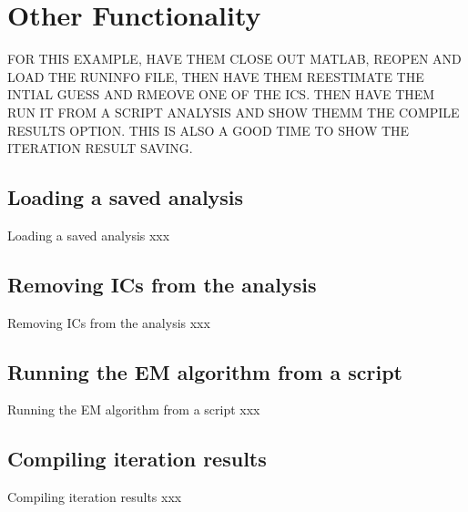 \documentclass[11pt]{beamer}
\begin{document}
\section{Other Functionality}

\begin{frame}
FOR THIS EXAMPLE, HAVE THEM CLOSE OUT MATLAB, REOPEN AND LOAD THE RUNINFO FILE, THEN HAVE THEM REESTIMATE THE INTIAL GUESS AND RMEOVE ONE OF THE ICS. THEN HAVE THEM RUN IT FROM A SCRIPT ANALYSIS AND SHOW THEMM THE COMPILE RESULTS OPTION. THIS IS ALSO A GOOD TIME TO SHOW THE ITERATION RESULT SAVING. 
\end{frame}

\subsection{Loading a saved analysis}
\begin{frame}{Loading a saved analysis}
xxx
\end{frame}

\subsection{Removing ICs from the analysis}
\begin{frame}{Removing ICs from the analysis}
xxx
\end{frame}

\subsection{Running the EM algorithm from a script}
\begin{frame}{Running the EM algorithm from a script}
xxx
\end{frame}

\subsection{Compiling iteration results}
\begin{frame}{Compiling iteration results}
xxx
\end{frame}
\end{document}
